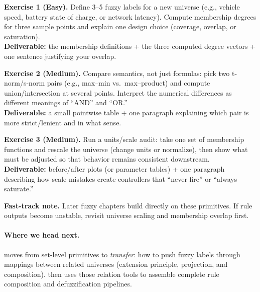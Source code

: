 \begin{tcolorbox}[summarybox, title={Exercises}]
\textbf{Exercise 1 (Easy).} Define 3--5 fuzzy labels for a new universe (e.g., vehicle speed, battery state of charge, or network latency). Compute membership degrees for three sample points and explain one design choice (coverage, overlap, or saturation). \\
\textbf{Deliverable:} the membership definitions + the three computed degree vectors + one sentence justifying your overlap.

\smallskip
\textbf{Exercise 2 (Medium).} Compare semantics, not just formulas: pick two t\hyp{}norm/s\hyp{}norm pairs (e.g., max--min vs.\ max--product) and compute union/intersection at several points. Interpret the numerical differences as different meanings of ``AND'' and ``OR.'' \\
\textbf{Deliverable:} a small pointwise table + one paragraph explaining which pair is more strict/lenient and in what sense.

\smallskip
\textbf{Exercise 3 (Medium).} Run a units/scale audit: take one set of membership functions and rescale the universe (change units or normalize), then show what must be adjusted so that behavior remains consistent downstream. \\
\textbf{Deliverable:} before/after plots (or parameter tables) + one paragraph describing how scale mistakes create controllers that ``never fire'' or ``always saturate.''

\medskip
\noindent\textbf{Fast-track note.} Later fuzzy chapters build directly on these primitives. If rule outputs become unstable, revisit universe scaling and membership overlap first.
\end{tcolorbox}

\paragraph{Where we head next.}  moves from set-level primitives to \emph{transfer}: how to push fuzzy labels through mappings between related universes (extension principle, projection, and composition).  then uses those relation tools to assemble complete rule composition and defuzzification pipelines.
